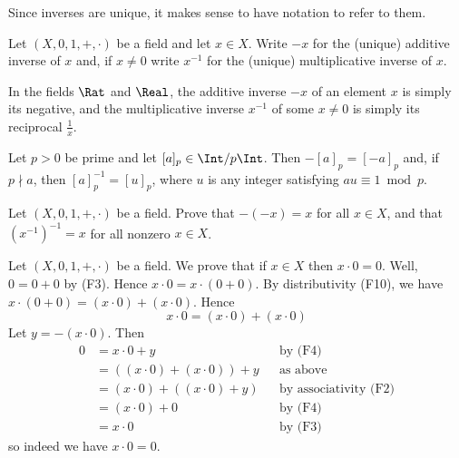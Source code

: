 Since inverses are unique, it makes sense to have notation to refer to them.

\begin{notation}
Let $(X,0,1,+,{\cdot})$ be a field and let $x \in X$. Write $-x$ for the (unique) additive inverse of $x$ and, if $x \ne 0$ write $x^{-1}$ for the (unique) multiplicative inverse of $x$.
\end{notation}

\begin{example}
\label{exQRAreFields}
In the fields $\Rat$ and $\Real$, the additive inverse $-x$ of an element $x$ is simply its negative, and the multiplicative inverse $x^{-1}$ of some $x \ne 0$ is simply its reciprocal $\frac{1}{x}$.
\end{example}

\begin{example}
Let $p>0$ be prime and let $[a]_p \in \Int/p\Int$. Then $-[a]_p=[-a]_p$ and, if $p \nmid a$, then $[a]_p^{-1} = [u]_p$, where $u$ is any integer satisfying $au \equiv 1 \bmod p$.
\end{example}

\begin{exercise}
\label{exInverseIsInvolution}
Let $(X, 0, 1, +, {\cdot})$ be a field. Prove that $-(-x)=x$ for all $x \in X$, and that $(x^{-1})^{-1} = x$ for all nonzero $x \in X$.

\end{exercise}

\begin{example}
Let $(X,0,1,+,{\cdot})$ be a field. We prove that if $x \in X$ then $x \cdot 0 = 0$. Well, $0=0+0$ by (F3). Hence $x \cdot 0 = x \cdot (0+0)$. By distributivity (F10), we have $x \cdot (0+0) = (x \cdot 0) + (x \cdot 0)$. Hence
\[ x \cdot 0 = (x \cdot 0) + (x \cdot 0) \]
Let $y=-(x \cdot 0)$. Then
\begin{align*}
0 &= x \cdot 0 + y && \text{by (F4)} \\
&= ((x \cdot 0) + (x \cdot 0)) + y && \text{as above} \\
&= (x \cdot 0) + ((x \cdot 0) + y) && \text{by associativity (F2)} \\
&= (x \cdot 0) + 0 && \text{by (F4)} \\
&= x \cdot 0 && \text{by (F3)}
\end{align*}
so indeed we have $x \cdot 0 = 0$.
\end{example}

